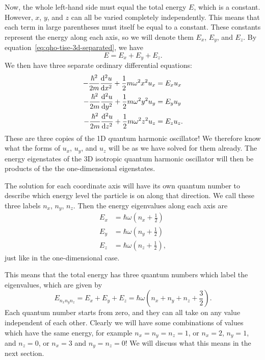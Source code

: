 \documentclass[../quantum_mechanics.tex]{subfiles}
\begin{document}
            Now, the whole left-hand side must equal the total energy $E$, which is a constant.
            However, $x$, $y$, and $z$ can all be varied completely independently.
            This means that each term in large parentheses must itself be equal to a constant.
            These constants represent the energy along each axis, so we will denote them $E_x$, $E_y$, and $E_z$.
            By equation~\ref{eq:qho-tise-3d-separated}, we have
            \begin{equation}
                E=E_x+E_y+E_z.
            \end{equation}
            We then have three separate ordinary differential equations:
            \begin{align}
                -\frac{\hbar^2}{2m}\dv[2]{u}{x}+\frac{1}{2}m\omega^2x^2u_x&=E_xu_x\\
                -\frac{\hbar^2}{2m}\dv[2]{u}{y}+\frac{1}{2}m\omega^2y^2u_y&=E_yu_y\\
                -\frac{\hbar^2}{2m}\dv[2]{u}{z}+\frac{1}{2}m\omega^2z^2u_z&=E_zu_z.
            \end{align}
            These are three copies of the 1D quantum harmonic oscillator!
            We therefore know what the forms of $u_x$, $u_y$, and $u_z$ will be as we have solved for them already.
            The energy eigenstates of the 3D isotropic quantum harmonic oscillator will then be products of the the one-dimensional eigenstates.

            The solution for each coordinate axis will have its own quantum number to describe which energy level the particle is on along that direction.
            We call these three labels $n_x$, $n_y$, $n_z$.
            Then the energy eigenvalues along each axis are
            \begin{align}
                E_x&=\hbar\omega\left(n_x+\frac{1}{2}\right)\\
                E_y&=\hbar\omega\left(n_y+\frac{1}{2}\right)\\
                E_z&=\hbar\omega\left(n_z+\frac{1}{2}\right),
            \end{align}
            just like in the one-dimensional case.

            This means that the total energy has three quantum numbers which label the eigenvalues, which are given by
            \begin{equation}\label{eq:qho-eigenvalues-3d}
                E_{n_xn_yn_z}=E_x+E_y+E_z=\hbar\omega\left(n_x+n_y+n_z+\frac{3}{2}\right).
            \end{equation}
            Each quantum number starts from zero, and they can all take on any value independent of each other.
            Clearly we will have some combinations of values which have the same energy, for example $n_x=n_y=n_z=1$, or $n_x=2$, $n_y=1$, and $n_z=0$, or $n_x=3$ and $n_y=n_z=0$!
            We will discuss what this means in the next section.
\end{document}

